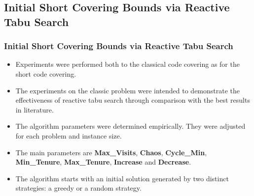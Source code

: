 \documentclass{beamer}
\begin{document}
\subsection{Initial Short Covering Bounds via Reactive Tabu Search}

\begin{frame}
  \frametitle{Initial Short Covering Bounds via Reactive Tabu Search}
{
	
\begin{itemize}
	\item<1-> Experiments were performed both to the classical code covering as for the short code covering.
	\item<2-> The experiments on the classic problem were intended to demonstrate the effectiveness of reactive tabu search through comparison with the best results in literature.
	\item<3-> The algorithm parameters were determined empirically. They were adjusted for each problem and instance size.
	\item<4-> The main parameters are {\bf Max\_Visits}, {\bf Chaos}, {\bf Cycle\_Min}, {\bf Min\_Tenure}, {\bf Max\_Tenure}, {\bf Increase} and {\bf Decrease}.
	\item<5-> The algorithm starts with an initial solution generated by two distinct strategies: a greedy or a random strategy.
\end{itemize}
}
\end{frame}
\end{document}
